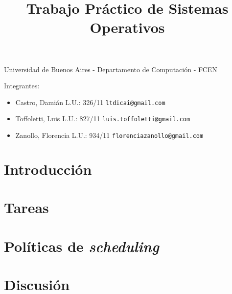 \documentclass[a4paper,11pt]{article}
\title{Trabajo Práctico de Sistemas Operativos}
\begin{document}
\maketitle

\begin{center}
	Universidad de Buenos Aires - Departamento de Computaci\'on - FCEN
\end{center}

\vspace{2cm}
Integrantes:

\begin{itemize}
	\item Castro, Dami\'an L.U.: 326/11  \verb+ltdicai@gmail.com+
	\item Toffoletti, Luis L.U.: 827/11 \verb+luis.toffoletti@gmail.com+
	\item Zanollo, Florencia L.U.: 934/11 \verb+florenciazanollo@gmail.com+
\end{itemize}

\newpage

\tableofcontents

\newpage

\section{Introducción}


\section{Tareas}





\newpage





\newpage



\newpage

\section{Pol\'iticas de \emph{scheduling}}


\newpage 



\newpage



\section{Discusi\'on}






\end{document}

